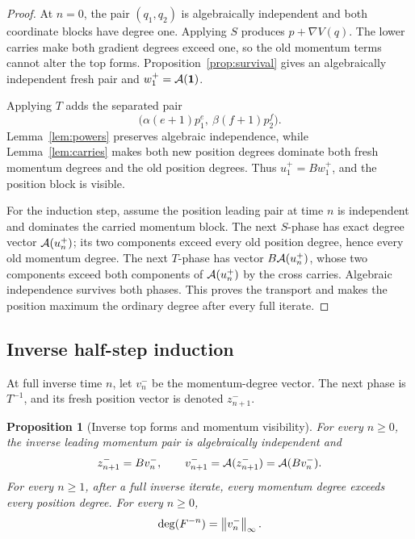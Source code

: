 \documentclass[11pt]{article}
\newtheorem{proposition}[theorem]{Proposition}
\theoremstyle{definition}
\theoremstyle{remark}
\begin{document}
\begin{proof}
At \(n=0\), the pair \((q_1,q_2)\) is algebraically independent and both
coordinate blocks have degree one.  Applying \(S\) produces
\(p+\nabla V(q)\).  The lower carries make both gradient degrees exceed
one, so the old momentum terms cannot alter the top forms.
Proposition~\ref{prop:survival} gives an algebraically independent fresh
pair and \(w_1^+=\mathcal{A}(\mathbf{1})\).

Applying \(T\) adds the separated pair
\[
\bigl(\alpha(e+1)p_1^e,\ \beta(f+1)p_2^f\bigr).
\]
Lemma~\ref{lem:powers} preserves algebraic independence, while
Lemma~\ref{lem:carries} makes both new position degrees dominate both
fresh momentum degrees and the old position degrees.  Thus
\(u_1^+=Bw_1^+\), and the position block is visible.

For the induction step, assume the position leading pair at time \(n\) is
independent and dominates the carried momentum block.  The next
\(S\)-phase has exact degree vector \(\mathcal{A}(u_n^+)\); its two components
exceed every old position degree, hence every old momentum degree.
The next \(T\)-phase has vector \(B\mathcal{A}(u_n^+)\), whose two components
exceed both components of \(\mathcal{A}(u_n^+)\) by the cross carries.
Algebraic independence survives both phases.  This proves the transport
and makes the position maximum the ordinary degree after every full
iterate.
\end{proof}

\subsection{Inverse half-step induction}

At full inverse time \(n\), let \(v_n^-\) be the momentum-degree vector.
The next phase is \(T^{-1}\), and its fresh position vector is denoted
\(z_{n+1}^-\).

\begin{proposition}[Inverse top forms and momentum visibility]
\label{prop:inverse}
For every \(n\geq0\), the inverse leading momentum pair is algebraically
independent and
\[
z^-_{n+1}=Bv^-_n,\qquad
v^-_{n+1}=\mathcal{A}(z^-_{n+1})=\mathcal{A}(Bv^-_n).
\]
For every \(n\geq1\), after a full inverse iterate, every momentum degree
exceeds every position degree.  For every \(n\geq0\),
\[
\deg(F^{-n})=\left\lVert v^-_n\right\rVert_{\infty}.
\]
\end{proposition}
\end{document}
